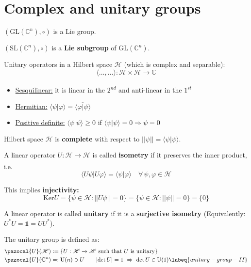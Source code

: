 \documentclass[../main.tex]{subfiles}
\begin{document}
\section{Complex and unitary groups}
\begin{example}$(\textrm{GL}(\mathbb{C}^n),\circ)$ is a Lie group.
\end{example}
\begin{example}
$(\textrm{SL}(\mathbb{C}^n),\circ)$ is a \textbf{Lie subgroup} of $\textrm{GL}(\mathbb{C}^n).$
\end{example}
\begin{example}
Unitary operators in a Hilbert space $\mathcal{H}$ (which is complex and separable):
\[
\langle\dots,\dots\rangle: \mathcal{H}\times \mathcal{H}\xrightarrow[]{}\mathbb{C}
\]
\begin{itemize}
    \item \underline{Sesquilinear:} it is linear in the $2^{nd}$ and anti-linear in the $1^{st}$
    \item \underline{Hermitian:} $\langle\psi|\varphi\rangle=\overline{\langle\varphi|\psi\rangle}$
    \item \underline{Positive definite:} $\langle\psi|\psi\rangle\ge0$ if $\langle\psi|\psi\rangle=0\Rightarrow\psi=0$
\end{itemize}
Hilbert space $\mathcal{H}$ is \textbf{complete} with respect to $||\psi||=\langle\psi|\psi\rangle$.
\end{example}
\begin{definition}[Isometry]
A linear operator $U:\mathcal{H}\xrightarrow[]{}\mathcal{H}$ is called \textbf{isometry} if it preserves the inner product, i.e.
\[
\langle U\psi|U\varphi\rangle=\langle\psi|\varphi\rangle \quad \forall\,\psi,\varphi\in\mathcal{H}
\]
\end{definition}
This implies \textbf{injectivity:}
\[
\text{Ker}U=\{\psi\in\mathcal{H}:||U\psi||=0\}=\{\psi\in\mathcal{H}:||\psi||=0\}=\{0\}
\]
\begin{definition}
A linear operator is called \textbf{unitary} if it is a \textbf{surjective isometry} (Equivalently: $U^*U=\mathbb{1}=UU^*$).
\end{definition}
\begin{definition}
The unitary group is defined as:
\begin{align}
\pazocal{U}(\mathcal{H})&:=\{U:\mathcal{H}\xrightarrow[]{}\mathcal{H} \text{ such that } U \text{ is unitary}\}\\
\pazocal{U}(\mathbb{C}^n)&=:\textrm{U}(n)\ni U\qquad  \abs{\det U}=1\  \Rightarrow \ \det  U \in \textrm{U}(1) \labeq{unitary-group-II}
\end{align}
\end{definition}
\end{document}
